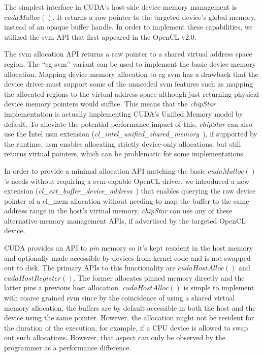 \documentclass[Afour,sageh,times]{sagej}
\newcommand{\chipstar}{\textit{chipStar}\xspace}
\newcommand{\func}[1]{$#1$\xspace}
\newcommand{\mycite}[1]{\citep{#1}}
\begin{document}
The simplest interface in CUDA's host-side device memory management is \func{cudaMalloc()}.
It returns a raw pointer to the targeted device's global memory, instead of an opaque buffer handle. 
In order to implement these
capabilities, we utilized the \gls{svm} API that first appeared in the OpenCL v2.0.

The \gls{svm} allocation API returns a raw pointer to a shared
virtual address space region. The ``\gls{cg} \gls{svm}'' variant can be used to
implement the basic device memory allocation. Mapping device memory allocation to \gls{cg} \gls{svm}
has a drawback that the device driver must support some of the unneeded \gls{svm} features such as
mapping the allocated regions to the virtual address space although just returning physical
device memory pointers would suffice. This means that the \chipstar implementation is actually
implementing CUDA's Unified Memory model by default. To alleviate the potential performance
impact of this, \chipstar can also use the Intel \gls{usm}
extension (\textit{cl\_intel\_unified\_shared\_memory}~\mycite{intel-usm}), if supported by the runtime. \gls{usm} enables allocating strictly
device-only allocations, but still returns virtual pointers, which can be problematic for some implementations. 

In order to provide a minimal allocation API matching the basic \func{cudaMalloc()}'s needs without requiring a \gls{svm}-capable OpenCL driver, we introduced a new extension (\textit{cl\_ext\_buffer\_device\_address}~\mycite{buffer-device-address}) that enables querying the raw device pointer of a cl\_mem allocation without needing to map the buffer to the same address range in the host's virtual memory. \chipstar can use any of these alternative memory management APIs, if advertised by the targeted OpenCL device.

CUDA provides an API to \textit{pin} memory so it's kept resident in the host memory and
optionally made accessible by devices from kernel code and is not swapped out to disk. 
The primary APIs to this functionality are
\func{cudaHostAlloc()} and \func{cudaHostRegister()}. The former allocates pinned
memory directly and the latter pins a previous host allocation. \func{cudaHostAlloc()}
is simple to implement with coarse grained \gls{svm} since by the coincidence of using
a shared virtual memory allocation, the buffers are by default accessible in both the host and
the device using the same pointer. However, the allocation might not be resident for the
duration of the execution, for example, if a CPU device is allowed to swap out such
allocations. However, that aspect can only be observed by the programmer as a performance difference.
\end{document}
